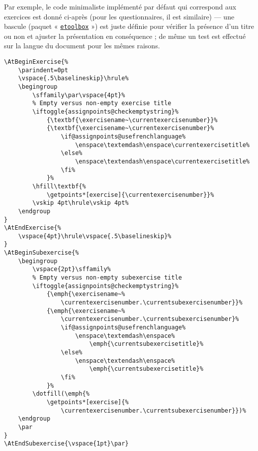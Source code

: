 \documentclass[
  twocolumn,%
  fontsize=9pt,%
  DIV=calc,%
  numbers=noendperiod%
]{scrartcl}
\newcommand{\lstenv}[1]{%
	\lstinline[%
		basicstyle=\ttfamily,%
		texcsstyle=*\color{texcscolor}\bfseries,
		keywordstyle=\color{keywordcolor}\bfseries,%
		identifierstyle=\color{black}\normalfont\ttfamily,%
		alsoletter={*},
		literate=*%
			{/}{{\textcolor{keywordcolor}{/}}}{1},
		keywords={%
			equal,
			tabular,
			enumerate,
			itemize,
			assignpoints,
			exercisepoints,
			exercise,
			quiz,
			subexercise,
			quizquestion,
			cleveref,
			caption,
			TikZ,
			PGF,
			tcolorbox,
			breakable,
			etoolbox
		},%
	]!#1!%
}
\begin{document}
Par exemple, le code minimaliste implémenté par défaut qui correspond aux exercices est donné ci-après (pour les questionnaires, il est similaire) --- une bascule (paquet « \href{https://www.ctan.org/pkg/etoolbox}{\texttt{etoolbox}} ») est juste définie pour vérifier la présence d'un titre ou non et ajuster la présentation en conséquence ; de même un test est effectué sur la langue du document pour les mêmes raisons.


\begin{lstlisting}[tabsize=1]
\AtBeginExercise{%
	\parindent=0pt
	\vspace{.5\baselineskip}\hrule%
	\begingroup
		\sffamily\par\vspace{4pt}%
		% Empty versus non-empty exercise title
		\iftoggle{assignpoints@checkemptystring}% 
			{\textbf{\exercisename~\currentexercisenumber}}%
			{\textbf{\exercisename~\currentexercisenumber}%
				\if@assignpoints@usefrenchlanguage%
					\enspace\textemdash\enspace\currentexercisetitle%
				\else%
					\enspace\textendash\enspace\currentexercisetitle%
				\fi%
			}%
		\hfill\textbf{%
			\getpoints*[exercise]{\currentexercisenumber}}%
		\vskip 4pt\hrule\vskip 4pt%
	\endgroup
}
\AtEndExercise{%
	\vspace{4pt}\hrule\vspace{.5\baselineskip}%
}
\AtBeginSubexercise{%
	\begingroup
		\vspace{2pt}\sffamily%
		% Empty versus non-empty subexercise title
		\iftoggle{assignpoints@checkemptystring}% 
			{\emph{\exercisename~%
				\currentexercisenumber.\currentsubexercisenumber}}%
			{\emph{\exercisename~%
				\currentexercisenumber.\currentsubexercisenumber}%
				\if@assignpoints@usefrenchlanguage%
					\enspace\textemdash\enspace%
						\emph{\currentsubexercisetitle}%
				\else%
					\enspace\textendash\enspace%
						\emph{\currentsubexercisetitle}%
				\fi%
			}%
		\dotfill(\emph{%
			\getpoints*[exercise]{%
				\currentexercisenumber.\currentsubexercisenumber}})%
	\endgroup
	\par
}
\AtEndSubexercise{\vspace{1pt}\par}
\end{lstlisting}
\end{document}
